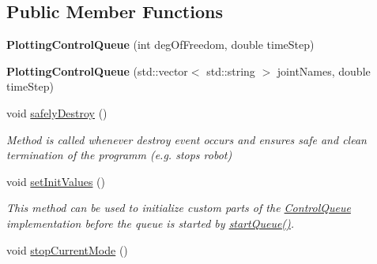 \subsection*{Public Member Functions}
\begin{DoxyCompactItemize}
\item 
\hypertarget{classkukadu_1_1PlottingControlQueue_a5776d92fe9c9ebd49752be09333e732f}{{\bfseries Plotting\-Control\-Queue} (int deg\-Of\-Freedom, double time\-Step)}\label{classkukadu_1_1PlottingControlQueue_a5776d92fe9c9ebd49752be09333e732f}

\item 
\hypertarget{classkukadu_1_1PlottingControlQueue_a49c262afda49f0659ba7a51d88677f35}{{\bfseries Plotting\-Control\-Queue} (std\-::vector$<$ std\-::string $>$ joint\-Names, double time\-Step)}\label{classkukadu_1_1PlottingControlQueue_a49c262afda49f0659ba7a51d88677f35}

\item 
void \hyperlink{classkukadu_1_1PlottingControlQueue_ae15b42e3d6b4b98bc2e470ff3ab3f7ea}{safely\-Destroy} ()
\begin{DoxyCompactList}\small\item\em Method is called whenever destroy event occurs and ensures safe and clean termination of the programm (e.\-g. stops robot) \end{DoxyCompactList}\item 
\hypertarget{classkukadu_1_1PlottingControlQueue_a6404b4ad14c35eaaf8d5afdf5ca271bb}{void \hyperlink{classkukadu_1_1PlottingControlQueue_a6404b4ad14c35eaaf8d5afdf5ca271bb}{set\-Init\-Values} ()}\label{classkukadu_1_1PlottingControlQueue_a6404b4ad14c35eaaf8d5afdf5ca271bb}

\begin{DoxyCompactList}\small\item\em This method can be used to initialize custom parts of the \hyperlink{classkukadu_1_1ControlQueue}{Control\-Queue} implementation before the queue is started by \hyperlink{classkukadu_1_1ControlQueue_a35d6a6e4e7c8467691c11567fe21f340}{start\-Queue()}. \end{DoxyCompactList}\item 
\hypertarget{classkukadu_1_1PlottingControlQueue_aa15ad1445f3b35e0d86a0e3f8b945ecb}{void \hyperlink{classkukadu_1_1PlottingControlQueue_aa15ad1445f3b35e0d86a0e3f8b945ecb}{stop\-Current\-Mode} ()}\label{classkukadu_1_1PlottingControlQueue_aa15ad1445f3b35e0d86a0e3f8b945ecb}


\end{DoxyCompactItemize}
